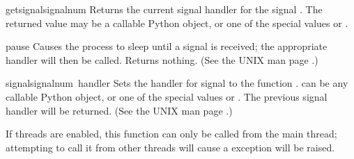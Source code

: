 \begin{funcdesc}{getsignal}{signalnum}
  Returns the current signal handler for the signal .
  The returned value may be a callable Python object, or one of the
  special values  or .
\end{funcdesc}

\begin{funcdesc}{pause}{}
  Causes the process to sleep until a signal is received; the
  appropriate handler will then be called.  Returns nothing.  (See the
  UNIX man page .)
\end{funcdesc}

\begin{funcdesc}{signal}{signalnum\, handler}
  Sets the handler for signal  to the function
  .   can be any callable Python object, or
  one of the special values  or
  .  The previous signal handler will be
  returned.  (See the UNIX man page .)

  If threads are enabled, this function can only be called from the
  main thread; attempting to call it from other threads will cause a
   exception will be raised.
\end{funcdesc}
